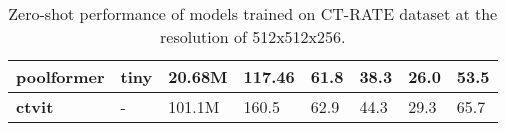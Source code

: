 \begin{table*}[t]
\begin{center}
\begin{tabular}{|l|l|l|l|l|l|l|l|}
        \textbf{poolformer \cite{yu2022metaformer}} & tiny & 20.68M & 117.46 & 61.8 & 38.3 & 26.0 & 53.5 \\ \hline        
        \textbf{ctvit \cite{hamamci2024foundation}} & - & 101.1M & 160.5 & 62.9 & 44.3 & 29.3 & 65.7 \\ \hline
    \end{tabular}
\end{center}
\caption{\label{results} Zero-shot performance of models trained on CT-RATE dataset at the resolution of 512x512x256.}
\end{table*}
